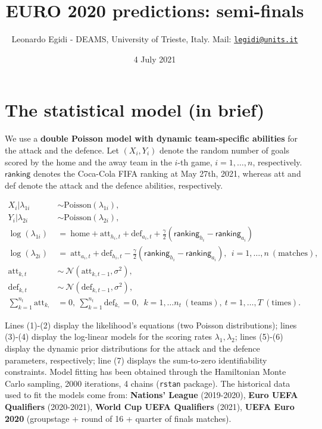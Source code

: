 \documentclass[
  10pt,
]{article}
\title{EURO 2020 predictions: semi-finals}
\author{Leonardo Egidi - DEAMS, University of Trieste, Italy. Mail:
\href{mailto:legidi@units.it}{\nolinkurl{legidi@units.it}}}
\date{4 July 2021}
\begin{document}
\maketitle

{
\setcounter{tocdepth}{2}
\tableofcontents
}
\hypertarget{the-statistical-model-in-brief}{%
\section{The statistical model (in
brief)}\label{the-statistical-model-in-brief}}

We use a \textbf{double Poisson model with dynamic team-specific
abilities} for the attack and the defence. Let \((X_{i}, Y_{i})\) denote
the random number of goals scored by the home and the away team in the
\(i\)-th game, \(i=1,\ldots,n\), respectively. \(\mathsf{ranking}\)
denotes the Coca-Cola FIFA ranking at May 27th, 2021, whereas att and
def denote the attack and the defence abilities, respectively.

\begin{align}
X_i| \lambda_{1i} &\sim \text{Poisson}(\lambda_{1i}),\\
Y_i|\lambda_{2i} &\sim \text{Poisson}(\lambda_{2i}),  \\
\log(\lambda_{1i}) &=\  \text{home} + \text{att}_{h_i, t}+ \text{def}_{a_i,t} + \frac{\gamma}{2}(\mathsf{ranking}_{h_i}-\mathsf{ranking}_{a_i}) \\
\log(\lambda_{2i}) & =\    \text{att}_{a_i,t} + \text{def}_{h_i,t} - \frac{\gamma}{2}(\mathsf{ranking}_{h_i}-\mathsf{ranking}_{a_i}), \ \ i=1,\ldots,n\ (\text{matches}), \\
\text{att}_{k, t} &\sim \ \mathcal{N}(\text{att}_{k, t-1}, \sigma^2), \\
\text{def}_{k, t} &\sim \  \mathcal{N}(\text{def}_{k, t-1}, \sigma^2),\\
\sum_{k=1}^{n_t} \text{att}_{k, }&=0, \  \sum_{k=1}^{n_t}\text{def}_{k, }=0, \ \ k=1,\ldots n_t \ (\text{teams}), \  t=1,\ldots, T \ (\text{times}).
\label{eq:scoring_rue}
\end{align}

Lines (1)-(2) display the likelihood's equations (two Poisson
distributions); lines (3)-(4) display the log-linear models for the
scoring rates \(\lambda_{1}, \lambda_{2}\); lines (5)-(6) display the
dynamic prior distributions for the attack and the defence parameters,
respectively; line (7) displays the sum-to-zero identifiability
constraints. Model fitting has been obtained through the Hamiltonian
Monte Carlo sampling, 2000 iterations, 4 chains (\texttt{rstan}
package). The historical data used to fit the models come from:
\textbf{Nations' League} (2019-2020), \textbf{Euro UEFA Qualifiers}
(2020-2021), \textbf{World Cup UEFA Qualifiers} (2021), \textbf{UEFA
Euro 2020} (groupstage + round of 16 + quarter of finals matches).
\end{document}

